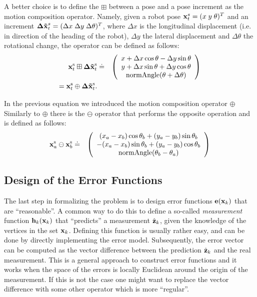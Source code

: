 \documentclass[a4paper]{article}
\begin{document}
A better choice is to define the $\boxplus$ between a pose and a pose
increment as the motion composition operator. Namely, given a robot
pose $\mathbf{x}^{s}_t = (x\; y\; \theta)^T$ and an increment $\mathbf{\Delta \tilde x}^{s}_t
= (\Delta x\; \Delta y\; \Delta \theta)^T$, where $\Delta x$ is the
longitudinal displacement (i.e. in direction of the heading of the robot),
$\Delta y$ the lateral displacement and $\Delta \theta$ the rotational
change, the operator can be defined as follows:
\begin{eqnarray}
    \mathbf{x}^\mathrm{s}_t \boxplus \mathbf{\Delta \tilde x}^\mathrm{s}_t   & \doteq &
    \left(
    \begin{array}{c}
      x + \Delta x \cos \theta - \Delta y \sin \theta \\
      y + \Delta x \sin \theta + \Delta y \cos \theta \\
      \mathrm{normAngle}(\theta + \Delta \theta)
    \end{array}
    \right)\\
    = \mathbf{x}^\mathrm{s}_t \oplus \mathbf{\Delta \tilde x}^\mathrm{s}_t.
\end{eqnarray}

In  the previous equation we introduced the motion composition operator $\oplus$
Similarly to $\oplus$ there is the $\ominus$ operator that performs the opposite operation
and is defined as follows:
\begin{eqnarray}
    \mathbf{x}^\mathrm{s}_a \ominus \mathbf{x}^\mathrm{s}_b   & \doteq &
    \left(
    \begin{array}{c}
        (x_a - x_b)  \cos \theta_b + (y_a - y_b) \sin \theta_b \\
      - (x_a - x_b)  \sin \theta_b + (y_a - y_b) \cos \theta_b \\
      \mathrm{normAngle}(\theta_b - \theta_a)
    \end{array}
    \right)
\end{eqnarray}

\subsection{Design of the Error Functions}
The last step in formalizing the problem is to design error functions
$\mathbf{e}(\mathbf{x}_k)$ that are ``reasonable''. A common way to do this to define a
so-called \emph{measurement} function $\mathbf{h}_k(\mathbf{x}_k)$ that ``predicts''
a measurement $\hat {\mathbf{z}}_k$, given the knowledge of the vertices in the
set $\mathbf{x}_k$. Defining this function is usually rather easy, and can be
done by directly implementing the error model. Subsequently, the error
vector can be computed as the vector difference between the prediction
$\hat {\mathbf{z}}_k$ and the real measurement.  This is a general approach to
construct error functions and it works when the space of the errors is
locally Euclidean around the origin of the measurement. If this is not
the case one might want to replace the vector difference with some
other operator which is more ``regular''.
\end{document}
